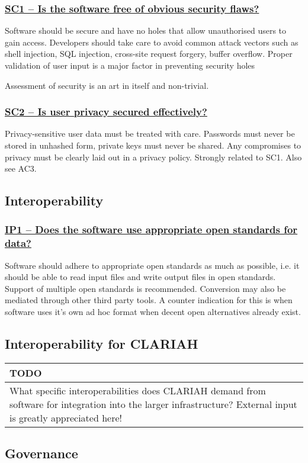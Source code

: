 \documentclass[a4paper,11pt]{article}
\newenvironment{TODO}{
\begin{center}
    \begin{tabular}[h!]{|p{0.8\textwidth}|}
    \hline
    {\bf TODO}\\\hline}
{   \\\hline
    \end{tabular}
\end{center}}
\newcommand{\indicator}[1]{\subsubsection*{\underline{#1}}}
\begin{document}
\indicator{SC1 -- Is the software free of obvious security flaws?}

Software should be secure and have no holes that allow unauthorised users to
gain access. Developers should take care to avoid common attack vectors such as
shell injection, SQL injection, cross-site request forgery, buffer overflow.
Proper validation of user input is a major factor in preventing security holes

Assessment of security is an art in itself and non-trivial. 

\indicator{SC2 -- Is user privacy secured effectively?}

Privacy-sensitive user data must be treated with care. Passwords must never be
stored in unhashed form, private keys must never be shared. Any compromises to
privacy must be clearly laid out in a privacy policy.  Strongly related to SC1.
Also see AC3.

\subsection{Interoperability}

\indicator{IP1 -- Does the software use appropriate open standards for data?}

Software should adhere to appropriate open standards as much as possible, i.e.
it should be able to read input files and write output files in open
standards. Support of multiple open standards is recommended. Conversion may
also be mediated through other third party tools. A counter indication for this
is when software uses it's own ad hoc format when decent open alternatives
already exist.

\subsection{Interoperability for CLARIAH}


\begin{TODO} 
What specific interoperabilities does CLARIAH demand from software for
integration into the larger infrastructure?  External input is greatly
appreciated here!
\end{TODO}


\subsection{Governance}
\end{document}
